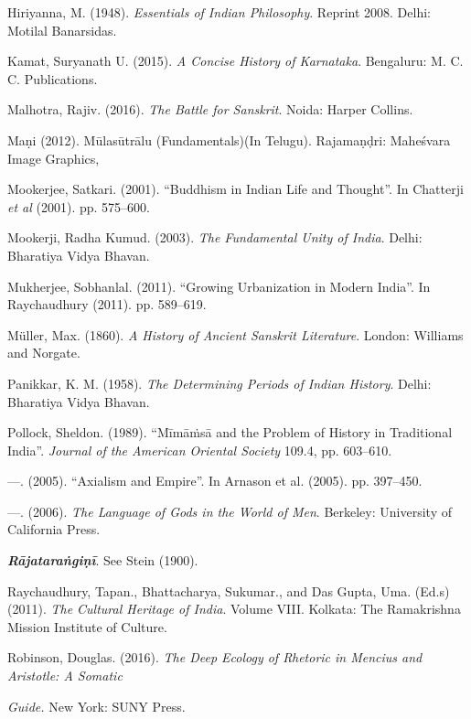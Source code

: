 \begin{thebibliography}{99}
  Hiriyanna, M. (1948). \textit{Essentials of Indian Philosophy}. Reprint 2008. Delhi: Motilal Banarsidas.

  Kamat, Suryanath U. (2015). \textit{A Concise History of Karnataka}. Bengaluru: M. C. C. Publications.

  Malhotra, Rajiv. (2016). \textit{The Battle for Sanskrit}. Noida: Harper Collins.

  Maṇi (2012). Mūlasūtrālu (Fundamentals)(In Telugu). Rajamaṇḍri: Maheśvara Image Graphics,

  Mookerjee, Satkari. (2001). “Buddhism in Indian Life and Thought”. In Chatterji \textit{et al} (2001). pp. 575–600.

  Mookerji, Radha Kumud. (2003). \textit{The Fundamental Unity of India}. Delhi: Bharatiya Vidya Bhavan.

  Mukherjee, Sobhanlal. (2011). “Growing Urbanization in Modern India”. In Raychaudhury (2011). pp. 589–619.

  Müller, Max. (1860). \textit{A History of Ancient Sanskrit Literature}. London: Williams and Norgate.

  Panikkar, K. M. (1958). \textit{The Determining Periods of Indian History}. Delhi: Bharatiya Vidya Bhavan.

  Pollock, Sheldon. (1989). “Mīmāṁsā and the Problem of History in Traditional India”. \textit{Journal of the American Oriental Society} 109.4, pp. 603–610.

  —. (2005). “Axialism and Empire”. In Arnason et al. (2005). pp. 397–450.

  —. (2006). \textit{The Language of Gods in the World of Men}. Berkeley: University of California Press.

  \textbf{\textit{Rājataraṅgiṇī}}. See Stein (1900).

  Raychaudhury, Tapan., Bhattacharya, Sukumar., and Das Gupta, Uma. (Ed.s) (2011). \textit{The Cultural Heritage of India}. Volume VIII. Kolkata: The Ramakrishna Mission Institute of Culture.

  Robinson, Douglas. (2016). \textit{The Deep Ecology of Rhetoric in Mencius and Aristotle: A Somatic }

  \textit{ Guide. }New York: SUNY Press.


\end{thebibliography}
